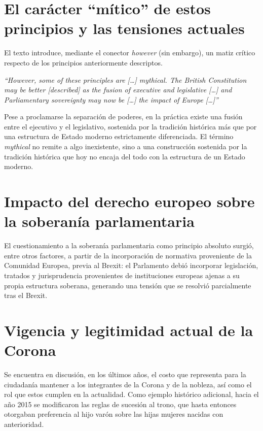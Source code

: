 \documentclass[12pt,oneside]{book}
\begin{document}
\section{El carácter ``mítico'' de estos principios y las tensiones actuales}

El texto introduce, mediante el conector \emph{however} (sin embargo), un matiz crítico respecto de los principios anteriormente descriptos.

\begin{important}
\emph{``However, some of these principles are [\ldots] mythical. The British Constitution may be better [described] as the fusion of executive and legislative [\ldots] and Parliamentary sovereignty may now be [\ldots] the impact of Europe [\ldots]''}

Pese a proclamarse la separación de poderes, en la práctica existe una fusión entre el ejecutivo y el legislativo, sostenida por la tradición histórica más que por una estructura de Estado moderno estrictamente diferenciada. El término \emph{mythical} no remite a algo inexistente, sino a una construcción sostenida por la tradición histórica que hoy no encaja del todo con la estructura de un Estado moderno.
\end{important}

\section{Impacto del derecho europeo sobre la soberanía parlamentaria}

El cuestionamiento a la soberanía parlamentaria como principio absoluto surgió, entre otros factores, a partir de la incorporación de normativa proveniente de la Comunidad Europea, previa al Brexit: el Parlamento debió incorporar legislación, tratados y jurisprudencia provenientes de instituciones europeas ajenas a su propia estructura soberana, generando una tensión que se resolvió parcialmente tras el Brexit.

\section{Vigencia y legitimidad actual de la Corona}

\begin{note}
Se encuentra en discusión, en los últimos años, el costo que representa para la ciudadanía mantener a los integrantes de la Corona y de la nobleza, así como el rol que estos cumplen en la actualidad. Como ejemplo histórico adicional, hacia el año 2015 se modificaron las reglas de sucesión al trono, que hasta entonces otorgaban preferencia al hijo varón sobre las hijas mujeres nacidas con anterioridad.
\end{note}
\end{document}
